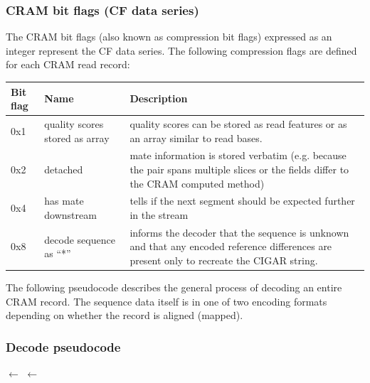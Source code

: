 \documentclass[a4paper]{article}
\begin{document}
\subsubsection*{\textbf{CRAM bit flags (CF data series)}}

The CRAM bit flags (also known as compression bit flags) expressed as an integer represent the CF data series. 
The following compression flags are defined for each CRAM read record:

\begin{tabular}{|>{\raggedright}p{39pt}|>{\raggedright}p{150pt}|>{\raggedright}p{242pt}|}
\hline
\textbf{Bit flag} & \textbf{Name} & \textbf{Description}\tabularnewline
\hline
0x1 & quality scores stored as array & quality scores can be stored as read features
or as an array similar to read bases.\tabularnewline
\hline
0x2 & detached & mate information is stored verbatim (e.g. because the pair spans multiple slices or the fields differ to the CRAM computed method)\tabularnewline
\hline
0x4 & has mate downstream & tells if the next segment should be expected further
in the stream\tabularnewline
\hline
0x8 & decode sequence as ``*'' & informs the decoder that the sequence
is unknown and that any encoded reference differences are present only to
recreate the CIGAR string.\tabularnewline
\hline
\end{tabular}


The following pseudocode describes the general process of decoding an entire CRAM record.
The sequence data itself is in one of two encoding formats depending on whether the record is aligned (mapped).

\subsubsection*{\textbf{Decode pseudocode}}
\newlength{\maxwidth}
\newcommand{\algalign}[2] %
{\makebox[\maxwidth][l]{$#1{}$}${}#2$}

\begin{algorithmic}[1]
\settowidth{\maxwidth}{CRAM\_flags\quad}
\State \algalign{BAM\_flags}{\gets}  
\State \algalign{CRAM\_flags}{\gets} 
\State {}
\State {}
\State {}
\State {}
\Statex

  \State {}
\Else
  \State {}
\EndIf
\EndProcedure
\end{algorithmic}
\end{document}
